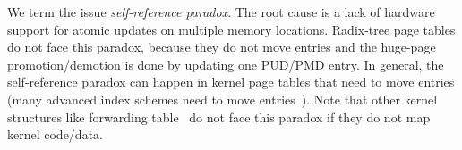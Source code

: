 We term the issue {\it self-reference paradox}. The root cause is a lack of hardware support 
	for atomic updates on multiple memory locations.
Radix-tree page tables do not face this paradox, because 
	they do not move entries and the huge-page promotion/demotion is done by updating one PUD/PMD entry.
In general, the self-reference paradox can happen in kernel page tables
	that need to move entries (many advanced index schemes need to move entries~\cite{Bender2023,zuo2018}). %
Note that other kernel structures like
forwarding table~\cite{zhou2013cuckooswitch} do not face this paradox if they do 
	not map kernel code/data.






